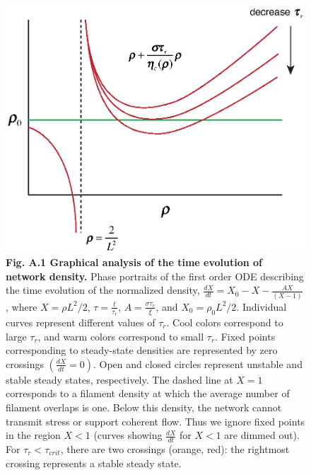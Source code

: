 \documentclass[10pt,letterpaper]{article}
\begin{document}
\begin{figure}[h!]
	\centering
	\includegraphics[width=\hsize]{figures/FigS0}
	\caption*{ \textbf{Fig. A.1 Graphical analysis of the time evolution of network density.}  Phase portraits of the first order ODE describing the time evolution of the normalized density, $\frac{dX}{dt}=X_0 - X - \frac{AX}{\left (X - 1\right )}$, where $X=\rho L^2/2$, $\tau = \frac{t}{\tau_r}$, $A=\frac{\sigma \tau_r}{\xi}$, and $X_0=\rho_0 L^2/2$.  Individual curves represent different values of $\tau_r$. Cool colors correspond to large $\tau_r$, and warm colors correspond to small $\tau_r$. Fixed points corresponding to steady-state densities are represented by zero crossings $\left(\frac{dX}{dt}=0\right)$. Open and closed circles represent unstable and stable steady states, respectively. The dashed line at $X=1$ corresponds to a filament density at which the average number of filament overlaps is one. Below this density, the network cannot transmit stress or support coherent flow.  Thus we ignore fixed points in the region $X<1$ (curves showing $\frac{dX}{dt}$ for $X<1$ are dimmed out). For $\tau_r < \tau_{crit}$, there are two crossings (orange, red): the rightmost crossing represents a stable steady state.  }
\end{figure}
\end{document}
